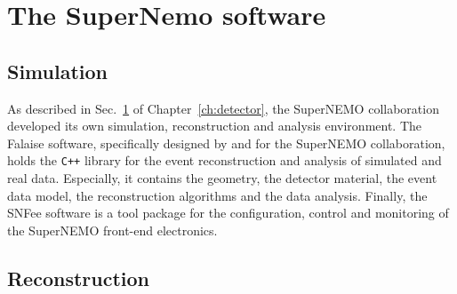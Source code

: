 \section{The SuperNemo software}
\label{sec:SNsoftware}
\subsection{Simulation}

As described in Sec.~\ref{sec:SNsoftware} of Chapter~\ref{ch:detector}, the SuperNEMO collaboration developed its own simulation, reconstruction and analysis environment.
The Falaise software, specifically designed by and for the SuperNEMO collaboration, holds the \verb!C++! library for the event reconstruction and analysis of simulated and real data.
Especially, it contains the geometry, the detector material, the event data model, the reconstruction algorithms and the data analysis.
Finally, the SNFee software is a tool package for the configuration, control and monitoring of the SuperNEMO front-end electronics.

\subsection{Reconstruction}
